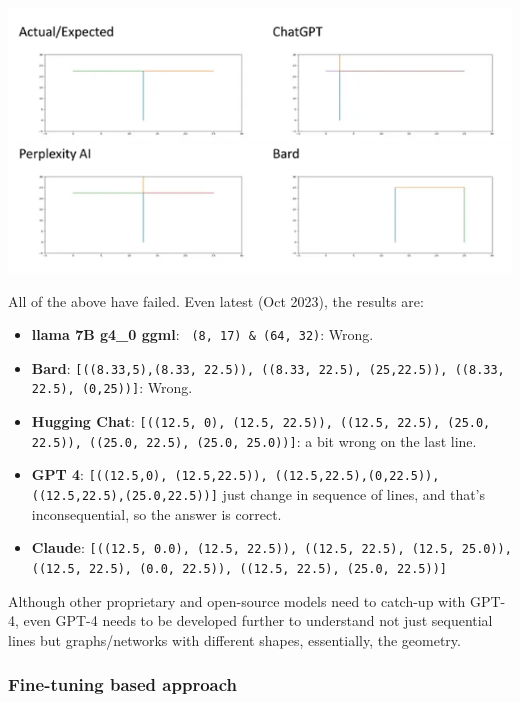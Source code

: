 \documentclass[conference]{IEEEtran}
\begin{document}
         \begin{center}
	\includegraphics[width=0.8\linewidth]{images/actual_predicted}
	\label{fig_results}
    \end{center}
    
All of the above have failed. Even latest (Oct 2023), the results are:
	\begin{itemize}
	\item {\bf llama 7B g4\_0 ggml}: \lstinline[basicstyle=\tiny, breaklines=true, breakatwhitespace=true]| (8, 17) & (64, 32)|: Wrong.
	\item {\bf Bard}: \lstinline[basicstyle=\tiny, breaklines=true, breakatwhitespace=true]|[((8.33,5),(8.33, 22.5)), ((8.33, 22.5), (25,22.5)), ((8.33, 22.5), (0,25))]|: Wrong.
	\item {\bf Hugging Chat}:  \lstinline[basicstyle=\tiny, breaklines=true, breakatwhitespace=true]|[((12.5, 0), (12.5, 22.5)), ((12.5, 22.5), (25.0, 22.5)), ((25.0, 22.5), (25.0, 25.0))]|: a bit wrong on the last line.
	\item {\bf GPT 4}:  \lstinline[basicstyle=\tiny, breaklines=true, breakatwhitespace=true]|[((12.5,0), (12.5,22.5)), ((12.5,22.5),(0,22.5)), ((12.5,22.5),(25.0,22.5))]| just change in sequence of lines, and that's inconsequential, so the answer is correct.
	\item {\bf Claude}:  \lstinline[basicstyle=\tiny, breaklines=true, breakatwhitespace=true]|[((12.5, 0.0), (12.5, 22.5)), ((12.5, 22.5), (12.5, 25.0)), ((12.5, 22.5), (0.0, 22.5)), ((12.5, 22.5), (25.0, 22.5))]|
\end{itemize}		    
    
Although other proprietary and open-source models need to catch-up with GPT-4, even GPT-4 needs to be developed further to understand not just sequential lines but graphs/networks with different shapes, essentially, the geometry.

\subsubsection{Fine-tuning based approach}
\label{subsubsec:2} 
\end{document}

